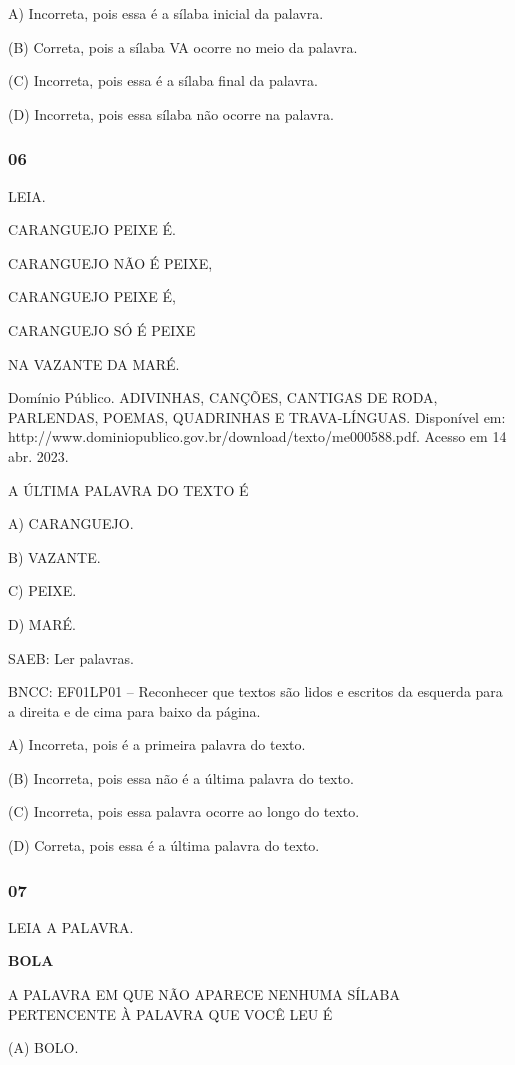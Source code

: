 A) Incorreta, pois essa é a sílaba inicial da palavra.

(B) Correta, pois a sílaba VA ocorre no meio da palavra.

(C) Incorreta, pois essa é a sílaba final da palavra.

(D) Incorreta, pois essa sílaba não ocorre na palavra.

\subsubsection{06}\label{section-62}

LEIA.

CARANGUEJO PEIXE É.

CARANGUEJO NÃO É PEIXE,

CARANGUEJO PEIXE É,

CARANGUEJO SÓ É PEIXE

NA VAZANTE DA MARÉ.

Domínio Público. ADIVINHAS, CANÇÕES, CANTIGAS DE RODA, PARLENDAS, POEMAS, QUADRINHAS E TRAVA-LÍNGUAS. Disponível em: http://www.dominiopublico.gov.br/download/texto/me000588.pdf. Acesso em 14 abr. 2023.

A ÚLTIMA PALAVRA DO TEXTO É

A) CARANGUEJO.

B) VAZANTE.

C) PEIXE.

D) MARÉ.

SAEB: Ler palavras.

BNCC: EF01LP01 -- Reconhecer que textos são lidos e escritos da esquerda para a
direita e de cima para baixo da página.

A) Incorreta, pois é a primeira palavra do texto.

(B) Incorreta, pois essa não é a última palavra do texto.

(C) Incorreta, pois essa palavra ocorre ao longo do texto.

(D) Correta, pois essa é a última palavra do texto.

\subsubsection{07}\label{section-63}

LEIA A PALAVRA.

\textbf{BOLA}

A PALAVRA EM QUE NÃO APARECE NENHUMA SÍLABA PERTENCENTE À PALAVRA QUE
VOCÊ LEU É

(A) BOLO.

